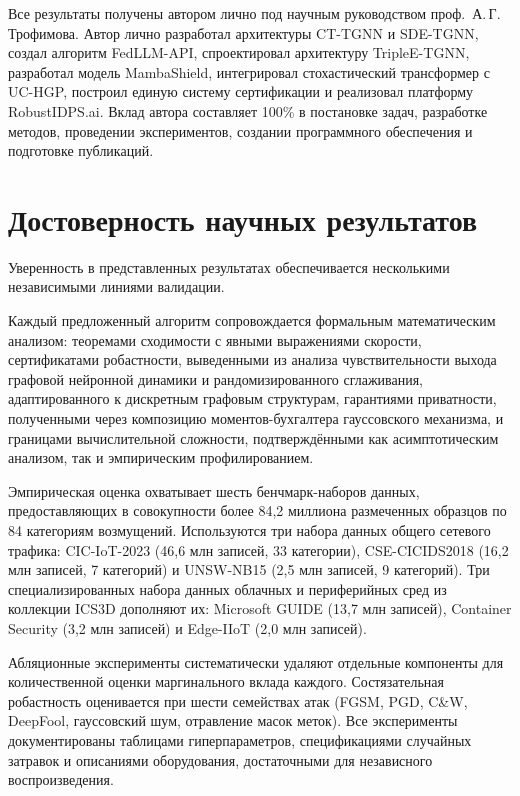 Все результаты получены автором лично под научным руководством проф.\ А.\,Г.\,Трофимова. Автор лично разработал архитектуры CT-TGNN и SDE-TGNN, создал алгоритм FedLLM-API, спроектировал архитектуру TripleE-TGNN, разработал модель MambaShield, интегрировал стохастический трансформер с UC-HGP, построил единую систему сертификации и реализовал платформу RobustIDPS.ai. Вклад автора составляет 100\% в постановке задач, разработке методов, проведении экспериментов, создании программного обеспечения и подготовке публикаций.

\section*{Достоверность научных результатов}

Уверенность в представленных результатах обеспечивается несколькими независимыми линиями валидации.

Каждый предложенный алгоритм сопровождается формальным математическим анализом: теоремами сходимости с явными выражениями скорости, сертификатами робастности, выведенными из анализа чувствительности выхода графовой нейронной динамики и рандомизированного сглаживания, адаптированного к дискретным графовым структурам, гарантиями приватности, полученными через композицию моментов-бухгалтера гауссовского механизма, и границами вычислительной сложности, подтверждёнными как асимптотическим анализом, так и эмпирическим профилированием.

Эмпирическая оценка охватывает шесть бенчмарк-наборов данных, предоставляющих в совокупности более 84,2 миллиона размеченных образцов по 84 категориям возмущений. Используются три набора данных общего сетевого трафика: CIC-IoT-2023 (46,6 млн записей, 33 категории), CSE-CICIDS2018 (16,2 млн записей, 7 категорий) и UNSW-NB15 (2,5 млн записей, 9 категорий). Три специализированных набора данных облачных и периферийных сред из коллекции ICS3D дополняют их: Microsoft GUIDE (13,7 млн записей), Container Security (3,2 млн записей) и Edge-IIoT (2,0 млн записей).

Абляционные эксперименты систематически удаляют отдельные компоненты для количественной оценки маргинального вклада каждого. Состязательная робастность оценивается при шести семействах атак (FGSM, PGD, C\&W, DeepFool, гауссовский шум, отравление масок меток). Все эксперименты документированы таблицами гиперпараметров, спецификациями случайных затравок и описаниями оборудования, достаточными для независного воспроизведения.

